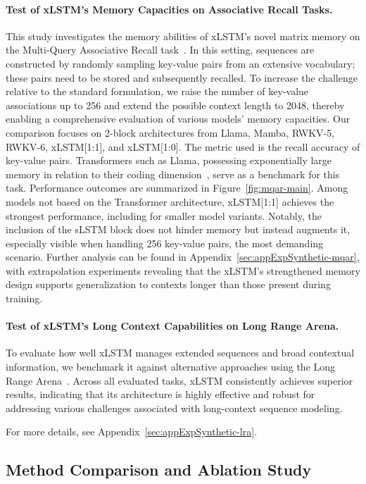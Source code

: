 \paragraph{Test of xLSTM's Memory Capacities on Associative Recall Tasks.} This study investigates the memory abilities of xLSTM’s novel matrix memory on the Multi-Query Associative Recall task~\citep{Arora:23arxiv}. In this setting, sequences are constructed by randomly sampling key-value pairs from an extensive vocabulary; these pairs need to be stored and subsequently recalled. To increase the challenge relative to the standard formulation, we raise the number of key-value associations up to 256 and extend the possible context length to 2048, thereby enabling a comprehensive evaluation of various models’ memory capacities. Our comparison focuses on 2-block architectures from Llama, Mamba, RWKV-5, RWKV-6, xLSTM[1:1], and xLSTM[1:0]. The metric used is the recall accuracy of key-value pairs. Transformers such as Llama, possessing exponentially large memory in relation to their coding dimension~\citep{Ramsauer:21}, serve as a benchmark for this task. Performance outcomes are summarized in Figure~\ref{fig:mqar-main}. Among models not based on the Transformer architecture, xLSTM[1:1] achieves the strongest performance, including for smaller model variants. Notably, the inclusion of the sLSTM block does not hinder memory but instead augments it, especially visible when handling 256 key-value pairs, the most demanding scenario. Further analysis can be found in Appendix~\ref{sec:appExpSynthetic-mqar}, with extrapolation experiments revealing that the xLSTM’s strengthened memory design supports generalization to contexts longer than those present during training.

\paragraph{Test of xLSTM's Long Context Capabilities on Long Range Arena.} To evaluate how well xLSTM manages extended sequences and broad contextual information, we benchmark it against alternative approaches using the Long Range Arena~\citep{Tay:21}. Across all evaluated tasks, xLSTM consistently achieves superior results, indicating that its architecture is highly effective and robust for addressing various challenges associated with long-context sequence modeling.

For more details, see Appendix~\ref{sec:appExpSynthetic-lra}.

\subsection{Method Comparison and Ablation Study}
\label{sec:ExpComparison}

